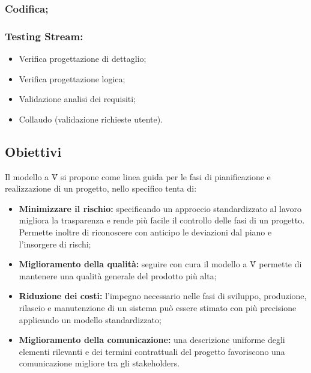 \subsubsection*{Codifica;}

\subsubsection*{Testing Stream:}
\begin{itemize}
    \item Verifica progettazione di dettaglio;
    \item Verifica progettazione logica;
    \item Validazione analisi dei requisiti;
    \item Collaudo (validazione richieste utente).
\end{itemize}

\subsection{Obiettivi}
Il modello a V\G{} si propone come linea guida per le fasi di pianificazione e realizzazione di un progetto,
nello specifico tenta di:
\begin{itemize}
    \item \textbf{Minimizzare il rischio:} specificando un approccio standardizzato al lavoro migliora 
    la trasparenza e rende più facile il controllo delle fasi di un progetto. Permette inoltre di 
    riconoscere con anticipo le deviazioni dal piano e l'insorgere di rischi;
    \item \textbf{Miglioramento della qualità:} seguire con cura il modello a V\G{} permette di mantenere una
    qualità generale del prodotto più alta;
    \item \textbf{Riduzione dei costi:} l'impegno necessario nelle fasi di sviluppo, produzione, rilascio
    e manutenzione di un sistema può essere stimato con più precisione applicando un modello standardizzato;
    \item \textbf{Miglioramento della comunicazione:} una descrizione uniforme degli elementi rilevanti 
    e dei termini contrattuali del progetto favoriscono una comunicazione migliore tra gli stakeholders.
\end{itemize}